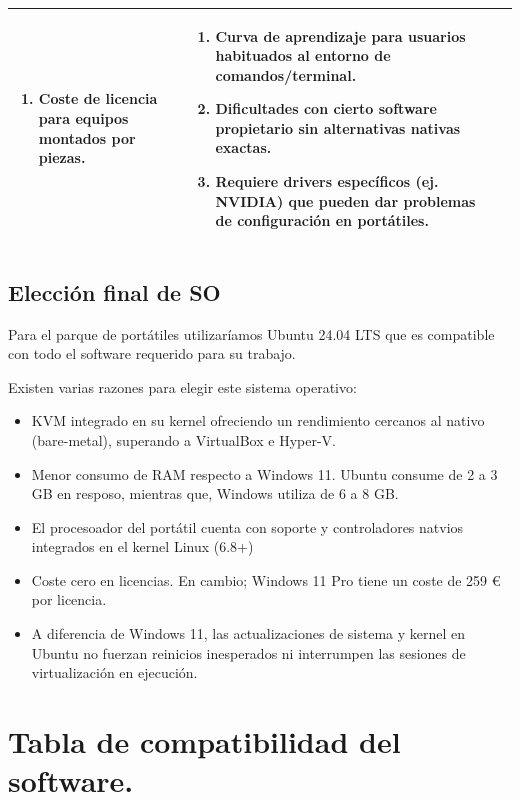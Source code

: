 \documentclass[11.5pt]{article}
\begin{document}
\begin{table}[H]
\begin{tabularx}{\textwidth}{|l|X|X|}
\begin{enumerate}[leftmargin=*,nosep]
				\item Coste de licencia para equipos montados por piezas.
			\end{enumerate} & 
			\begin{enumerate}[leftmargin=*,nosep]
				\item Curva de aprendizaje para usuarios habituados al entorno de comandos/terminal.
				\item Dificultades con cierto software propietario sin alternativas nativas exactas.
				\item Requiere drivers específicos (ej. NVIDIA) que pueden dar problemas de configuración en portátiles.
			\end{enumerate} \\
			\hline
		\end{tabularx}
	\end{table}
	
	\subsection{Elección final de SO}
	
	Para el parque de portátiles utilizaríamos Ubuntu 24.04 LTS que es compatible con todo el software requerido para su trabajo.
	
	Existen varias razones para elegir este sistema operativo:
	
	\begin{itemize}
		\item KVM integrado en su kernel ofreciendo un rendimiento cercanos al nativo (bare-metal), superando a VirtualBox e Hyper-V.
		\item 	Menor consumo de RAM respecto a Windows 11. Ubuntu consume de 2 a 3 GB en resposo, mientras que, Windows utiliza de 6 a 8 GB.
		\item 	El procesoador del portátil cuenta con soporte y controladores natvios integrados en el kernel Linux (6.8+)
		\item 	Coste cero en licencias. En cambio; Windows 11 Pro tiene un coste de 259 € por licencia.
		\item 	A diferencia de Windows 11, las actualizaciones de sistema y kernel en Ubuntu no fuerzan reinicios inesperados ni interrumpen las sesiones de virtualización en ejecución.
	\end{itemize}
	
	\section{Tabla de compatibilidad del software.}
	
\end{document}
